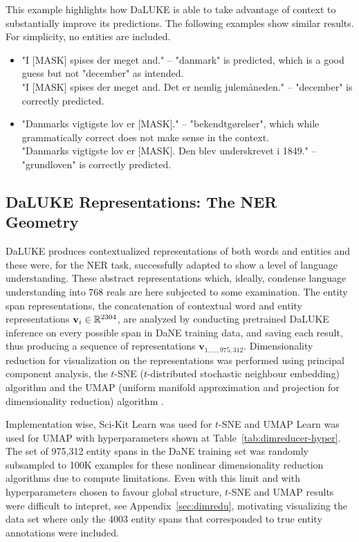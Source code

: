 \documentclass[main.tex]{subfiles}
\begin{document}
This example highlights how DaLUKE is able to take advantage of context to substantially improve its predictions.
The following examples show similar results.
For simplicity, no entities are included.
\begin{itemize}
    \item "I [MASK] spises der meget and." -- "danmark" is predicted, which is a good guess but not "december" as intended.\\
    "I [MASK] spises der meget and. Det er nemlig julemåneden." -- "december" is correctly predicted.
    \item "Danmarks vigtigste lov er [MASK]." -- "bekendtgørelser", which while grammatically correct does not make sense in the context.\\
    "Danmarks vigtigste lov er [MASK]. Den blev underskrevet i 1849." -- "grundloven" is correctly predicted.
\end{itemize}


\subsection{DaLUKE Representations: The NER Geometry}
DaLUKE produces contextualized representations of both words and entities and these were, for the NER task, successfully adapted to show a level of language understanding.
These abstract representations which, ideally, condense language understanding into 768 reals are here subjected to some examination.
The entity span representations, the concatenation of contextual word and entity representations $\mathbf v_i \in \mathbb R^{2304}$, are analyzed by conducting pretrained DaLUKE inference on every possible span in DaNE training data, and saving each result, thus producing a sequence of representations $\mathbf v_{1, \ldots, 975,312}$.
Dimensionality reduction for visualization on the representations was performed using principal component analysis, the $t$-SNE ($t$-distributed stochastic neighbour embedding) algorithm \cite{maaten2008tsne} and the UMAP (uniform manifold approximation and projection for dimensionality reduction) algorithm \cite{mcinnes2020umap}.

Implementation wise, Sci-Kit Learn was used for $t$-SNE \cite{pedregosa2011scikit} and UMAP Learn was used for UMAP \cite{mcinnes2018umap-software} with hyperparameters shown at Table~\ref{tab:dimreducer-hyper}.
The set of 975,312 entity spans in the DaNE training set was randomly subsampled to 100K examples for these nonlinear dimensionality reduction algorithms due to compute limitations.
Even with this limit and with hyperparameters chosen to favour global structure, $t$-SNE and UMAP results were difficult to intepret, see Appendix~\ref{sec:dimredu}, motivating visualizing the data set where only the 4003 entity spans that corresponded to true entity annotations were included.
\end{document}
